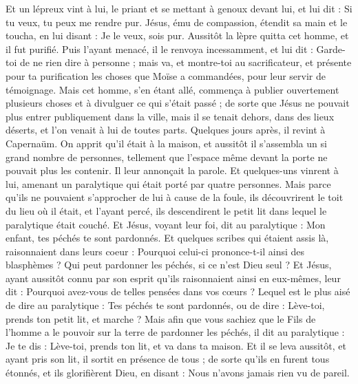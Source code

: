 \begin{multicols}{2}
Et un lépreux vint à lui, le priant et se mettant à genoux devant lui, et lui dit : Si tu veux, tu peux me rendre pur.
Jésus, ému de compassion, étendit sa main et le toucha, en lui disant : Je le veux, sois pur.
Aussitôt la lèpre quitta cet homme, et il fut purifié.
Puis l’ayant menacé, il le renvoya incessamment,
et lui dit : Garde-toi de ne rien dire à personne ; mais va, et montre-toi au sacrificateur, et présente pour ta purification les choses que Moïse a commandées, pour leur servir de témoignage.
Mais cet homme, s’en étant allé, commença à publier ouvertement  plusieurs choses et à divulguer ce qui s'était passé ; de sorte que Jésus ne pouvait plus entrer publiquement dans la ville, mais il se tenait dehors, dans des lieux déserts, et l’on venait à lui de toutes parts.
\VerseOne{}Quelques jours après, il revint à Capernaüm. On apprit qu'il était à la maison,
et aussitôt il s’assembla un si grand nombre de personnes, tellement que l'espace même devant la porte ne pouvait plus les contenir. Il leur annonçait la parole.
Et quelques-uns vinrent à lui, amenant un paralytique qui était porté par quatre personnes.
Mais parce qu'ils ne pouvaient s’approcher de lui à cause de la foule, ils découvrirent le toit du lieu où il était, et l'ayant percé, ils descendirent le petit lit dans lequel le paralytique était couché.
Et Jésus, voyant leur foi, dit au paralytique : Mon enfant, tes péchés te sont pardonnés.
Et quelques scribes qui étaient assis là, raisonnaient dans leurs coeur :
Pourquoi celui-ci prononce-t-il ainsi des blasphèmes ? Qui peut pardonner les péchés, si ce n’est Dieu seul ?
Et Jésus, ayant aussitôt connu par son esprit qu'ils raisonnaient ainsi en eux-mêmes, leur dit : Pourquoi avez-vous de telles pensées dans vos cœurs ?
Lequel est le plus aisé de dire au paralytique : Tes péchés te sont pardonnés, ou de dire : Lève-toi, prends ton petit lit, et marche ?
Mais afin que vous sachiez que le Fils de l'homme a le pouvoir sur la terre de pardonner les péchés, il dit au paralytique :
Je te dis : Lève-toi, prends ton lit, et va dans ta maison.
Et il se leva aussitôt, et ayant pris son lit, il sortit en présence de tous ; de sorte qu'ils en furent tous étonnés, et ils glorifièrent Dieu, en disant : Nous n’avons jamais rien vu de pareil.

\end{multicols}
